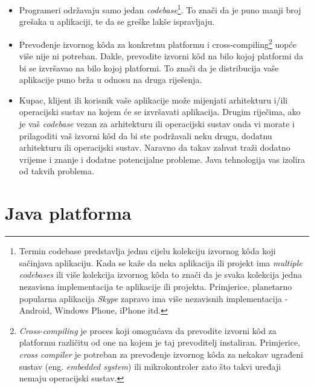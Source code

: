 \begin{itemize}
    \item Programeri održavaju samo jedan \emph{codebase}\footnote{Termin codebase predstavlja jednu cijelu kolekciju izvornog kôda koji sačinjava aplikaciju. Kada se kaže da neka aplikacija ili projekt ima \emph{multiple codebases} ili više kolekcija izvornog kôda to znači da je svaka kolekcija jedna nezavisna implementacija te aplikacije ili projekta. Primjerice, planetarno popularna aplikacija \emph{Skype} zapravo ima više nezavisnih implementacija - Android, Windows Phone, iPhone itd.}. To znači da je puno manji broj grešaka u aplikaciji, te da se greške lakše ispravljaju.
    
    \item Prevođenje izvornog kôda za konkretnu platformu i cross-compiling\footnote{\emph{Cross-compiling} je proces koji omogućava da prevodite izvorni kôd za platformu različitu od one na kojem je taj prevoditelj instaliran. Primjerice, \emph{cross compiler} je potreban za prevođenje izvornog kôda za nekakav ugrađeni sustav (eng. \emph{embedded system}) ili mikrokontroler zato što takvi uređaji nemaju operacijski sustav.} uopće više nije ni potreban. Dakle, prevodite izvorni kôd na bilo kojoj platformi da bi se izvršavao na bilo kojoj platformi. To znači da je distribucija vaše aplikacije puno brža u odnosu na druga riješenja.
    
    \item Kupac, klijent ili korisnik vaše aplikacije može mijenjati arhitekturu i/ili operacijski sustav na kojem će se izvršavati aplikacija. Drugim riječima, ako je vaš \emph{codebase} vezan za arhitekturu ili operacijski sustav onda vi morate i prilagoditi vaš izvorni kôd da bi ste podržavali neku drugu, dodatnu arhitekturu ili operacijski sustav. Naravno da takav zahvat traži dodatno vrijeme i znanje i dodatne potencijalne probleme. Java tehnologija vas izolira od takvih problema.
\end{itemize}

\section{Java platforma}